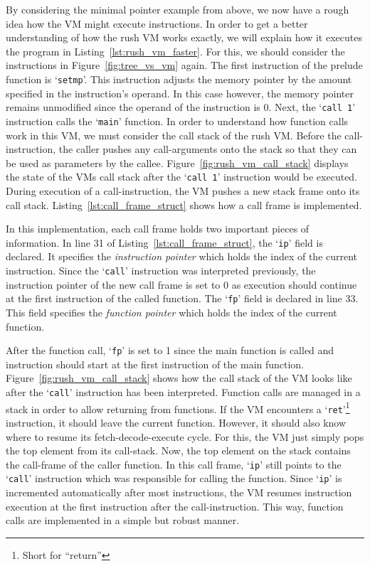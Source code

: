By considering the minimal pointer example from above, we now have a rough idea how the VM might execute instructions.
In order to get a better understanding of how the rush VM works exactly, we will explain how it executes the program in Listing~\ref{lst:rush_vm_faster}.
For this, we should consider the instructions in Figure~\ref{fig:tree_vs_vm} again.
The first instruction of the prelude function is `\texttt{setmp}'.
This instruction adjusts the memory pointer by the amount specified in the instruction's operand.
In this case however, the memory pointer remains unmodified since the operand of the instruction is 0.
Next, the `\texttt{call 1}' instruction calls the `\texttt{main}' function.
In order to understand how function calls work in this VM, we must consider the call stack of the rush VM\@.
Before the call-instruction, the caller pushes any call-arguments onto the stack so that they can be used as parameters by the callee.
Figure~\ref{fig:rush_vm_call_stack} displays the state of the VMs call stack after the `\texttt{call 1}' instruction would be executed.
During execution of a call-instruction, the VM pushes a new stack frame onto its call stack.
Listing~\ref{lst:call_frame_struct} shows how a call frame is implemented.


In this implementation, each call frame holds two important pieces of information.
In line 31 of Listing~\ref{lst:call_frame_struct}, the `\texttt{ip}' field is declared.
It specifies the \emph{instruction pointer} which holds the index of the current instruction.
Since the `\texttt{call}' instruction was interpreted previously, the instruction pointer of the new call frame is set to 0 as execution should continue at the first instruction of the called function.
The `\texttt{fp}' field is declared in line 33.
This field specifies the \emph{function pointer} which holds the index of the current function.

After the function call, `\texttt{fp}' is set to 1 since the main function is called and instruction should start at the first instruction of the main function.
Figure~\ref{fig:rush_vm_call_stack} shows how the call stack of the VM looks like after the `\texttt{call}' instruction has been interpreted.
Function calls are managed in a stack in order to allow returning from functions.
If the VM encounters a `\texttt{ret}'\footnote{Short for \enquote{return}} instruction, it should leave the current function.
However, it should also know where to resume its fetch-decode-execute cycle.
For this, the VM just simply pops the top element from its call-stack.
Now, the top element on the stack contains the call-frame of the caller function.
In this call frame, `\texttt{ip}' still points to the `\texttt{call}' instruction which was responsible for calling the function.
Since `\texttt{ip}' is incremented automatically after most instructions, the VM resumes instruction execution at the first instruction after the call-instruction.
This way, function calls are implemented in a simple but robust manner.

